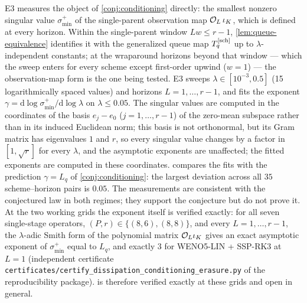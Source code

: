 \documentclass[pdflatex,sn-mathphys-num]{sn-jnl}%
\theoremstyle{thmstyleone}%
\theoremstyle{thmstyletwo}%
\theoremstyle{thmstylethree}%
\newcommand{\OL}{{\cal O}_L}
\begin{document}
E3 measures the object of \cref{conj:conditioning} directly: the smallest nonzero singular value $\sigma^{+}_{\min}$ of the single-parent observation map $\OL\,\iota_K$, which is defined at every horizon.
Within the single-parent window $Lw\le r-1$, \cref{lem:queue-equivalence} identifies it with the generalized queue map $T^{[\rm sch]}_q$ up to $\lambda$-independent constants; at the wraparound horizons beyond that window --- which the sweep enters for every scheme except first-order upwind ($w=1$) --- the observation-map form is the one being tested.
E3 sweeps $\lambda\in[10^{-3},0.5]$ (15 logarithmically spaced values) and horizons $L=1,\ldots,r-1$, and fits the exponent $\gamma=\mathrm d\log\sigma^{+}_{\min}/\mathrm d\log\lambda$ on $\lambda\le0.05$.
The singular values are computed in the coordinates of the basis $e_j-e_0$ ($j=1,\ldots,r-1$) of the zero-mean subspace rather than in its induced Euclidean norm; this basis is not orthonormal, but its Gram matrix has eigenvalues $1$ and $r$, so every singular value changes by a factor in $[1,\sqrt r]$ for every $\lambda$, and the asymptotic exponents are unaffected; the fitted exponents are computed in these coordinates.
 compares the fits with the prediction $\gamma=L_q$ of \cref{conj:conditioning}: the largest deviation across all $35$ scheme--horizon pairs is $0.05$.
The measurements are consistent with the conjectured law in both regimes; they support the conjecture but do not prove it.
At the two working grids the exponent itself is verified exactly: for all seven single-stage operators, $(P,r)\in\{(8,6),(8,8)\}$, and every $L=1,\ldots,r-1$, the $\lambda$-adic Smith form of the polynomial matrix $\OL\iota_K$ gives an exact asymptotic exponent of $\sigma^{+}_{\min}$ equal to $L_q$, and exactly $3$ for WENO5-LIN + SSP-RK3 at $L=1$ (independent certificate \texttt{certificates/certify\_dissipation\_conditioning\_erasure.py} of the reproducibility package).
 is therefore verified exactly at these grids and open in general.
\end{document}
